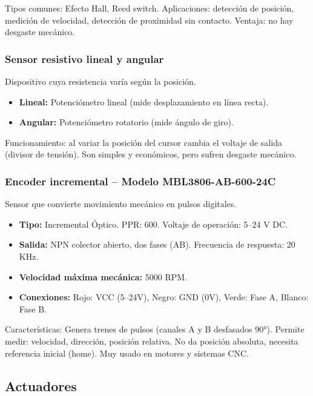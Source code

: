 \documentclass[11pt]{article}
\begin{document}
Tipos comunes: Efecto Hall, Reed switch. Aplicaciones: detección de posición, medición de velocidad, detección de proximidad sin contacto. Ventaja: no hay desgaste mecánico.

\subsubsection{Sensor resistivo lineal y angular}

Dispositivo cuya resistencia varía según la posición.

\begin{itemize}
	\item \textbf{Lineal:} Potenciómetro lineal (mide desplazamiento en línea recta).
	\item \textbf{Angular:} Potenciómetro rotatorio (mide ángulo de giro).
\end{itemize}

Funcionamiento: al variar la posición del cursor cambia el voltaje de salida (divisor de tensión). Son simples y económicos, pero sufren desgaste mecánico.

\subsubsection{Encoder incremental – Modelo MBL3806-AB-600-24C}

Sensor que convierte movimiento mecánico en pulsos digitales.

\begin{itemize}
	\item \textbf{Tipo:} Incremental Óptico. PPR: 600. Voltaje de operación: 5–24 V DC.
	\item \textbf{Salida:} NPN colector abierto, dos fases (AB). Frecuencia de respuesta: 20 KHz.
	\item \textbf{Velocidad máxima mecánica:} 5000 RPM.
	\item \textbf{Conexiones:} Rojo: VCC (5–24V), Negro: GND (0V), Verde: Fase A, Blanco: Fase B.
\end{itemize}

Características: Genera trenes de pulsos (canales A y B desfasados 90°). Permite medir: velocidad, dirección, posición relativa. No da posición absoluta, necesita referencia inicial (home). Muy usado en motores y sistemas CNC.

\subsection{Actuadores}
\end{document}
